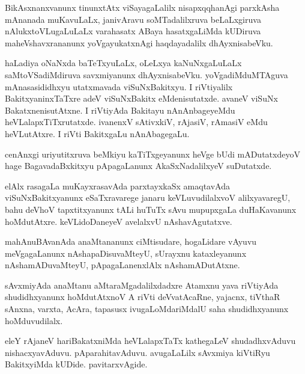 \documentclass{article}
\begin{document}
\begin{mn}%
BikAsxnanxvanunx tinunxtAtx viSayagaLalilx nisapxqqhanAgi parxkAsha mAnanada muKavuLaLx, 
janivAravu soMTadalilxruva beLaLxgiruva nAlukxtoVLugaLuLaLx varahasatx ABaya 
hasatxgaLiMda kUDiruva maheVshavxrananunx yoVgayukatxnAgi haqdayadalilx dhAyxnisabeVku.
\end{mn}

\begin{mn}%
haLadiya oNaNxda baTeTxyuLaLx, oLeLxya kaNuNxgaLuLaLx saMtoVSadiMdiruva savxmiyanunx 
dhAyxnisabeVku. yoVgadiMduMTAguva mAnasasididhxyu utatxmavada viSuNxBakitxyu. I 
riVtiyalilx BakitxyaninxTaTxre adeV viSuNxBakitx eMdenisutatxde. avaneV viSuNx 
BakatxnenisutAtxne. I riVtiyAda Bakitayu nAnAnbageyeMdu heVLalapxTiTxrutatxde. ivanenxV 
sAtivxkiV, rAjasiV, rAmasiV eMdu heVLutAtxre. I riVti BakitxgaLu nAnAbagegaLu.
\end{mn}

\begin{mn}%
cenAnxgi uriyutitxruva beMkiyu kaTiTxgeyanunx heVge bUdi mADutatxdeyoV hage BagavadaBxkitxyu 
pApagaLanunx AkaSxNadalilxyeV suDutatxde.
\end{mn}

\begin{mn}%
elAlx rasagaLa muKayxrasavAda parxtayxkaSx amaqtavAda viSuNxBakitxyanunx eSaTxravarege 
janaru keVLuvudilalxvoV alilxyavaregU, bahu deVhoV tapxtitxyanunx tALi huTuTx sAvu 
mupupxgaLa duHaKavanunx hoMdutAtxre. keVLidoDaneyeV avelalxvU nAshavAgutatxve.
\end{mn}

\begin{mn}%
mahAnuBAvanAda anaMtananunx ciMtisudare, hogaLidare vAyuvu meVgagaLanunx 
nAshapaDisuvaMteyU, sUrayxnu kataxleyanunx nAshamADuvaMteyU, pApagaLanenxlAlx 
nAshamADutAtxne.
\end{mn}

\begin{mn}%
sAvxmiyAda anaMtanu aMtaraMgadalilxdadxre Atamxnu yava riVtiyAda shudidhxyanunx 
hoMdutAtxnoV A riVti deVvatAcaRne, yajacnx, tiVthaR sAnxna, varxta, AcAra, tapasusx 
ivugaLoMdariMdalU saha shudidhxyanunx hoMduvudilalx.
\end{mn}

\begin{mn}%
eleY rAjaneV hariBakatxniMda heVLalapxTaTx kathegaLeV shudadhxvAduvu nishacxyavAduvu. 
pAparahitavAduvu. avugaLaLilx sAvxmiya kiVtiRyu BakitxyiMda kUDide. pavitarxvAgide.
\end{mn}
\end{document}
